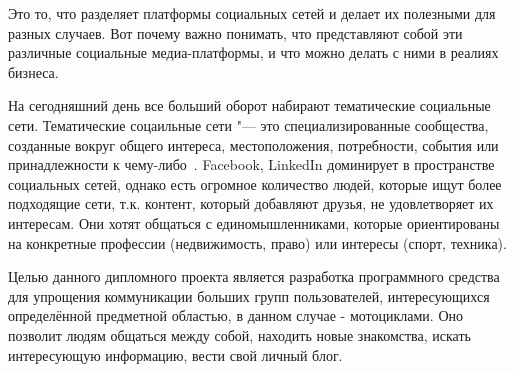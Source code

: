 Это то, что разделяет платформы социальных сетей и делает их
полезными для разных случаев. Вот почему важно понимать, что
представляют собой эти различные социальные медиа-платформы, и что
можно делать с ними в реалиях бизнеса. 

На сегодняшний день все больший оборот набирают тематические социальные сети. Тематические соцаильные сети "--- это специализированные сообщества, созданные вокруг общего интереса, местоположения, потребности, события или принадлежности к чему-либо~\cite{verticalSN}. 
Facebook, LinkedIn доминирует в пространстве социальных сетей, однако есть огромное количество людей, которые ищут более подходящие сети, т.к. контент, который добавляют друзья, не удовлетворяет их интересам.
Они хотят общаться с единомышленниками, которые ориентированы на конкретные профессии (недвижимость, право) или интересы (спорт, техника). 

Целью данного дипломного проекта является разработка программного средства 
для упрощения коммуникации больших групп пользователей,
интересующихся определённой предметной областью, в данном случае -
мотоциклами. Оно позволит людям общаться между собой, находить новые
знакомства, искать интересующую информацию, вести свой личный блог.